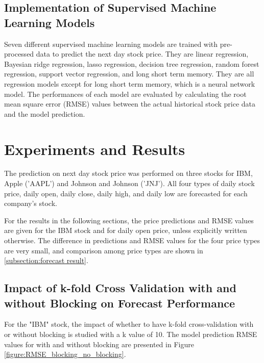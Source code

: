 \documentclass[conference]{IEEEtran}
\begin{document}
\subsection{Implementation of Supervised Machine Learning Models}
Seven different supervised machine learning models are trained with pre-processed data to predict the next day stock price. They are linear regression, Bayesian ridge regression, lasso regression, decision tree regression, random forest regression, support vector regression, and long short term memory. They are all regression models except for long short term memory, which is a neural network model. The performances of each model are evaluated by calculating the root mean square error (RMSE) values between the actual historical stock price data and the model prediction.

\section{Experiments and Results}
\label{section:experiments}
The prediction on next day stock price was performed on three stocks for IBM, Apple ('AAPL') and Johnson and Johnson ('JNJ'). All four types of daily stock price, daily open, daily close, daily high, and daily low are forecasted for each company's stock. 

For the results in the following sections, the price predictions and RMSE values are given for the IBM stock and for daily open price, unless explicitly written otherwise. The difference in predictions and RMSE values for the four price types are very small, and comparison among price types are shown in \ref{subsection:forecast result}. 

\subsection{Impact of k-fold Cross Validation with and without Blocking on Forecast Performance}
For the "IBM" stock, the impact of whether to have k-fold cross-validation with or without blocking is studied with a k value of 10. The model prediction RMSE values for with and without blocking are presented in Figure \ref{figure:RMSE_blocking_no_blocking}. 
\end{document}
